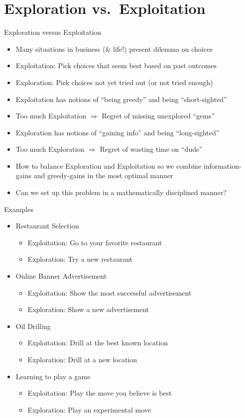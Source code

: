 \section{Exploration vs.\ Exploitation}
\begin{frame}{Exploration versus Exploitation}
\begin{itemize}
    \item Many situations in business (\& life!) present dilemma on choices
    \item Exploitation: Pick choices that seem best based on past outcomes
    \item Exploration: Pick choices not yet tried out (or not tried enough)
    \item Exploitation has notions of ``being greedy'' and being ``short-sighted''
    \item Too much Exploitation $\Rightarrow$ Regret of missing unexplored ``gems''
    \item Exploration has notions of ``gaining info'' and being ``long-sighted''
    \item Too much Exploration $\Rightarrow$ Regret of wasting time on ``duds''
    \item How to balance Exploration and Exploitation so we combine
          information-gains and greedy-gains in the most optimal manner
    \item Can we set up this problem in a mathematically disciplined manner?
\end{itemize}
\end{frame}

\begin{frame}{Examples}
\begin{itemize}
    \item Restaurant Selection
    \begin{itemize}
        \item Exploitation: Go to your favorite restaurant
        \item Exploration: Try a new restaurant
    \end{itemize}
    \item Online Banner Advertisement
    \begin{itemize}
        \item Exploitation: Show the most successful advertisement
        \item Exploration: Show a new advertisement
    \end{itemize}
    \item Oil Drilling
    \begin{itemize}
        \item Exploitation: Drill at the best known location
        \item Exploration: Drill at a new location
    \end{itemize}
    \item Learning to play a game
    \begin{itemize}
        \item Exploitation: Play the move you believe is best
        \item Exploration: Play an experimental move
    \end{itemize}
\end{itemize}
\end{frame}

